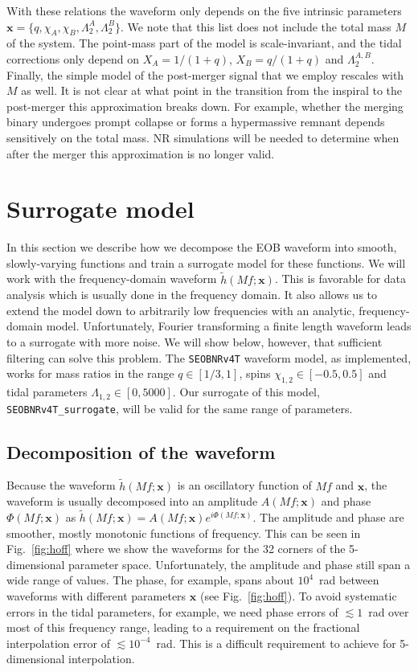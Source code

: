 \documentclass[prd,aps,letter,twocolumn,floatfix,notitlepage,nofootinbib]{revtex4-1}
\def\bx{\mathbf{x}}
\begin{document}
With these relations the waveform only depends on the five intrinsic parameters $\bx=\{q, \chi_A, \chi_B, \Lambda_2^A,\Lambda_2^B\}$. 
We note that this list does not include the total mass $M$ of the system. The point-mass part of the model is scale-invariant, and the tidal corrections only depend on $X_A=1/(1+q)$, $X_B=q/(1+q)$ and $\Lambda_2^{A,B}$. Finally, the simple model of the post-merger signal that we employ rescales with $M$ as well. It is not clear at what point in the transition from the inspiral to the post-merger this approximation breaks down. For example, whether the merging binary undergoes prompt collapse or forms a hypermassive remnant depends sensitively on the total mass. NR simulations will be needed to determine when after the merger this approximation is no longer valid.

\section{Surrogate model}
\label{sec:surrogate}

In this section we describe how we decompose the EOB waveform into smooth, slowly-varying functions and train a surrogate model for these functions. We will work with the frequency-domain waveform $\tilde h(Mf; \bx)$. This is favorable for data analysis which is usually done in the frequency domain. It also allows us to extend the model down to arbitrarily low frequencies with an analytic, frequency-domain model. Unfortunately, Fourier transforming a finite length waveform leads to a surrogate with more noise. We will show below, however, that sufficient filtering can solve this problem. The \texttt{SEOBNRv4T} waveform model, as implemented, works for mass ratios in the range $q \in [1/3, 1]$, spins $\chi_{1,2} \in [-0.5, 0.5]$ and tidal parameters $\Lambda_{1,2} \in [0, 5000]$. Our surrogate of this model, \texttt{SEOBNRv4T\_surrogate}, will be valid for the same range of parameters.


\subsection{Decomposition of the waveform}

Because the waveform $\tilde h(Mf; \bx)$ is an oscillatory function of $Mf$ and $\bx$, the waveform is usually decomposed into an amplitude $A(Mf; \bx)$ and phase $\Phi(Mf; \bx)$ as $\tilde h(Mf; \bx) = A(Mf; \bx) e^{i\Phi(Mf; \bx)}$. The amplitude and phase are smoother, mostly monotonic functions of frequency. 
This can be seen in Fig.~\ref{fig:hoff} where we show the waveforms for the 32 corners of the 5-dimensional parameter space. Unfortunately, the amplitude and phase still span a wide range of values. The phase, for example, spans about $10^4$~rad between waveforms with different parameters $\bx$ (see Fig.~\ref{fig:hoff}). To avoid systematic errors in the tidal parameters, for example, we need phase errors of $\lesssim 1$~rad over most of this frequency range, leading to a requirement on the fractional interpolation error of $\lesssim 10^{-4}$~rad. This is a difficult requirement to achieve for 5-dimensional interpolation. 
\end{document}
